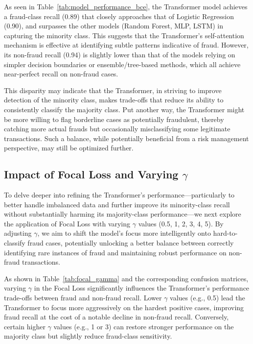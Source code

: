 \documentclass[11pt, oneside]{article}   	%
\begin{document}
As seen in Table~\ref{tab:model_performance_bce}, the Transformer model achieves a fraud-class recall (0.89) that closely approaches that of Logistic Regression (0.90), and surpasses the other models (Random Forest, MLP, LSTM) in capturing the minority class. This suggests that the Transformer’s self-attention mechanism is effective at identifying subtle patterns indicative of fraud. However, its non-fraud recall (0.94) is slightly lower than that of the models relying on simpler decision boundaries or ensemble/tree-based methods, which all achieve near-perfect recall on non-fraud cases.

This disparity may indicate that the Transformer, in striving to improve detection of the minority class, makes trade-offs that reduce its ability to consistently classify the majority class. Put another way, the Transformer might be more willing to flag borderline cases as potentially fraudulent, thereby catching more actual frauds but occasionally misclassifying some legitimate transactions. Such a balance, while potentially beneficial from a risk management perspective, may still be optimized further.

\subsection{Impact of Focal Loss and Varying \(\gamma\)}

To delve deeper into refining the Transformer's performance—particularly to better handle imbalanced data and further improve its minority-class recall without substantially harming its majority-class performance—we next explore the application of Focal Loss with varying \(\gamma\) values (0.5, 1, 2, 3, 4, 5). By adjusting \(\gamma\), we aim to shift the model’s focus more intelligently onto hard-to-classify fraud cases, potentially unlocking a better balance between correctly identifying rare instances of fraud and maintaining robust performance on non-fraud transactions.

As shown in Table~\ref{tab:focal_gamma} and the corresponding confusion matrices, varying \(\gamma\) in the Focal Loss significantly influences the Transformer's performance trade-offs between fraud and non-fraud recall. Lower \(\gamma\) values (e.g., 0.5) lead the Transformer to focus more aggressively on the hardest positive cases, improving fraud recall at the cost of a notable decline in non-fraud recall. Conversely, certain higher \(\gamma\) values (e.g., 1 or 3) can restore stronger performance on the majority class but slightly reduce fraud-class sensitivity. 
\end{document}
